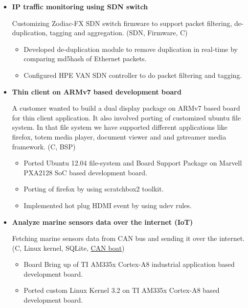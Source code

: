 \documentclass[letterpaper,10pt]{article}
\newcommand{\resitem}[1]{\item #1 \vspace{-2pt}}
\begin{document}
\begin{itemize}
\item
    \textbf{IP traffic monitoring using SDN switch}
    
     Customizing Zodiac-FX SDN switch firmware to support packet filtering, de-duplication, tagging and aggregation. (SDN, Firmware, C)
     
	\begin{itemize}
		\resitem{Developed de-duplication module to remove duplication in real-time by comparing md5hash of Ethernet packets.}
		
		\resitem{Configured HPE VAN SDN controller to do packet filtering and tagging.}
		
    \end{itemize}
	
\item
    \textbf{Thin client on ARMv7 based development board}
    
    A customer wanted to build a dual display package on ARMv7 based board for thin client application. It also involved porting of customized ubuntu file system. In that file system we have supported different applications like firefox, totem media player, document viewer and and gstreamer media framework. (C, BSP)
    
	\begin{itemize}
	    \resitem{Ported Ubuntu 12.04 file-system and Board Support Package on Marvell PXA2128 SoC based development board.}
	    
	    \resitem{Porting of firefox by using scratchbox2 toolkit.}
	    
	    \resitem{Implemented hot plug HDMI event by using udev rules.}
	    
	\end{itemize}
	
\item
    \textbf{Analyze marine sensors data over the internet (IoT)}
	
    Fetching marine sensors data from CAN bus and sending it over the internet. (C, Linux kernel, SQLite, \href{https://github.com/mehul-m-prajapati/canboa}{CAN boat})
    
	\begin{itemize}
	    \resitem{Board Bring up of TI AM335x Cortex-A8 industrial application based development board.}
	
	    \resitem{Ported custom Linux Kernel 3.2 on TI AM335x Cortex-A8 based development board.}
	    

\end{itemize}
\end{itemize}
\end{document}
